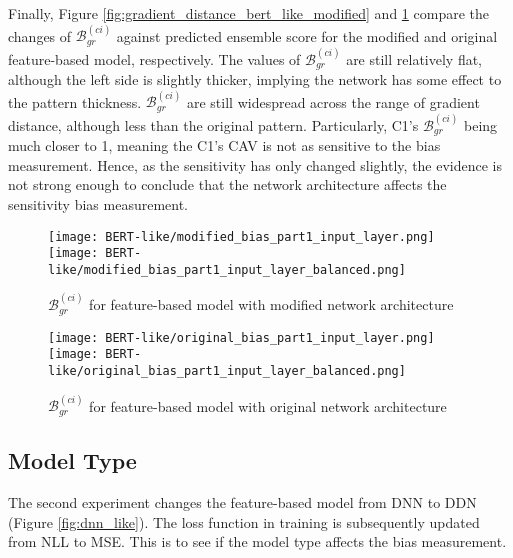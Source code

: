 Finally, Figure \ref{fig:gradient_distance_bert_like_modified} and \ref{fig:gradient_distance_bert_like_original} compare the changes of $\mathcal{B}^{(ci)}_{gr}$ against predicted ensemble score for the modified and original feature-based model, respectively. The values of $\mathcal{B}^{(ci)}_{gr}$ are still relatively flat, although the left side is slightly thicker, implying the network has some effect to the pattern thickness. $\mathcal{B}^{(ci)}_{gr}$ are still widespread across the range of gradient distance, although less than the original pattern. Particularly, C1's $\mathcal{B}^{(ci)}_{gr}$ being much closer to 1, meaning the C1's CAV is not as sensitive to the bias measurement. Hence, as the sensitivity has only changed slightly, the evidence is not strong enough to conclude that the network architecture affects the sensitivity bias measurement.

\begin{figure}[H]
    \centering
    \begin{minipage}[t]{0.48\textwidth}
        \centering
        \texttt{[image: BERT-like/modified\_bias\_part1\_input\_layer.png]}
        \hfill
        \texttt{[image: BERT-like/modified\_bias\_part1\_input\_layer\_balanced.png]}
        \caption{$\mathcal{B}^{(ci)}_{gr}$ for feature-based model with modified network architecture}
        \label{fig:gradient_distance_bert_like_modified}
    \end{minipage}
    \hfill
    \begin{minipage}[t]{0.48\textwidth}
        \centering
        \texttt{[image: BERT-like/original\_bias\_part1\_input\_layer.png]}
        \hfill
        \texttt{[image: BERT-like/original\_bias\_part1\_input\_layer\_balanced.png]}
        \caption{$\mathcal{B}^{(ci)}_{gr}$ for feature-based model with original network architecture}
        \label{fig:gradient_distance_bert_like_original}
    \end{minipage}
\end{figure}


\subsection{Model Type}
The second experiment changes the feature-based model from DNN to DDN (Figure \ref{fig:dnn_like}). The loss function in training is subsequently updated from NLL to MSE. This is to see if the model type affects the bias measurement.

